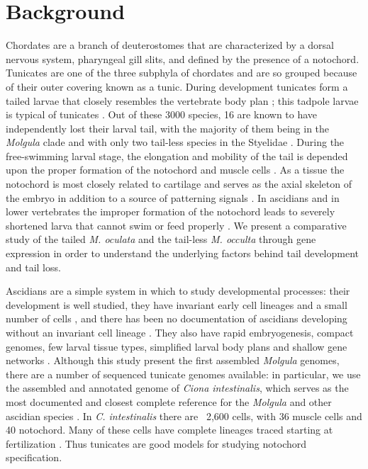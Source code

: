\chapter{Background}
Chordates are a branch of deuterostomes that are characterized by a dorsal nervous system, pharyngeal gill slits, and defined by the presence of a notochord. Tunicates are one of the three subphyla of chordates and are so grouped because of their outer covering known as a tunic. During development tunicates form a tailed larvae that closely resembles the vertebrate body plan \cite{jeffery_minireview_2002}; this tadpole larvae is typical of  tunicates \cite{huber_evolution_2000}. Out of these 3000 species, 16 are known to have independently lost their larval tail, with the majority of them being in the \textit{Molgula} clade \cite{berrill_studies_1931,swalla_interspecific_1990} and with only two tail-less species in the Styelidae \cite{huber_evolution_2000}. During the free-swimming larval stage, the elongation and mobility of the tail is depended upon the proper formation of the notochord and muscle cells \cite{satoh_ascidian_2003}. As a tissue the notochord is most closely related to cartilage and serves as the axial skeleton of the embryo in addition to a source of patterning signals \cite{jeffery_evolution_1999}. In ascidians and in lower vertebrates the improper formation of the notochord leads to severely shortened larva that cannot swim or feed properly \cite{di_gregorio_tail_2002,jiang_ascidian_2005,stemple_structure_2005}.
We present a comparative study of the tailed \textit{M. oculata} and the tail-less \textit{M. occulta} through gene expression in order to understand the underlying factors behind tail development and tail loss.

Ascidians are a simple system in which to study developmental processes: their development is well studied, they have invariant early cell lineages and a small number of cells \cite{lemaire_evolutionary_2011}, and there has been no documentation of ascidians developing without an invariant cell lineage \cite{lemaire_ascidians_2008}. They also have rapid embryogenesis, compact genomes, few larval tissue types, simplified larval body plans and shallow gene networks \cite{corbo_characterization_1997,jeffery_minireview_2002,dehal_draft_2002}. Although this study present the first assembled \textit{Molgula} genomes, there are a number of sequenced tunicate genomes available: in particular, we use the assembled and annotated genome of \textit{Ciona intestinalis}, which serves as the most documented and closest complete reference for the \textit{Molgula} and other ascidian species \cite{dehal_draft_2002,satoh_ascidian_2003,satoh_ciona_2003}. In \textit{C. intestinalis} there are ~2,600 cells, with 36 muscle cells and 40 notochord.  Many of these cells have complete lineages traced starting at fertilization \cite{nishida_cell_1983}. Thus tunicates are good models for studying notochord specification.

